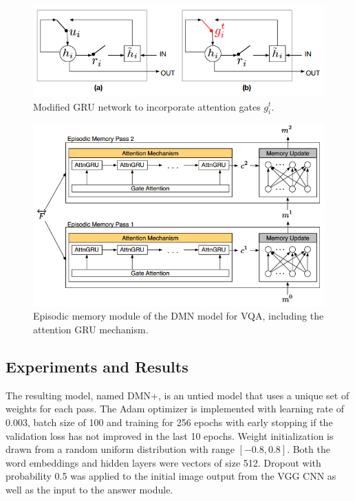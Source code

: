 \documentclass{article}
\begin{document}
    \begin{figure}[ht]
    	\centering
            \includegraphics[width=0.75\linewidth]{dmnGRU.PNG}
    	\caption{Modified GRU network to incorporate attention gates $g_i^t$.}
    	\label{dmnGRU}
    \end{figure}
    \begin{figure}[ht]
    	\centering
            \includegraphics[width=0.75\linewidth]{dmnMemory.PNG}
    	\caption{Episodic memory module of the DMN model for VQA, including the attention GRU mechanism.}
    	\label{dmnMemory}
    \end{figure}

\subsection{Experiments and Results}
The resulting model, named DMN+, is an untied model that uses a unique set of weights for each pass. The Adam optimizer is implemented with learning rate of 0.003, batch size of 100 and training for 256 epochs with early stopping if the validation loss has not improved in the last 10 epochs. Weight initialization is drawn from a random uniform distribution with range $[-0.8,0.8]$. Both the word embeddings and hidden layers were vectors of size 512. Dropout with probability 0.5 was applied to the initial image output from the VGG CNN as well as the input to the answer module.
\end{document}
